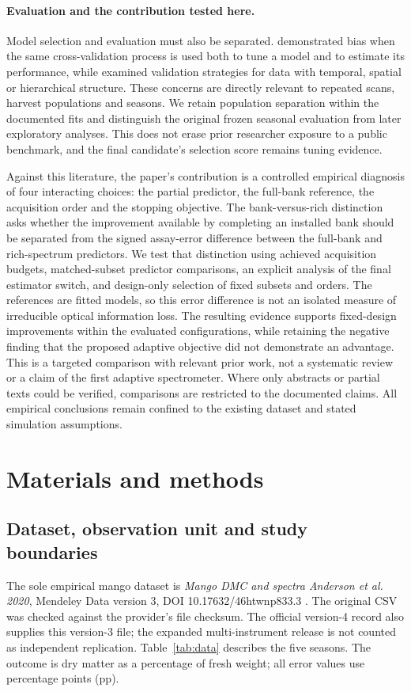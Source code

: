 \documentclass[11pt,a4paper]{article}
\begin{document}
\paragraph{Evaluation and the contribution tested here.}
Model selection and evaluation must also be separated. \citet{varma2006} demonstrated bias when the same cross-validation process is used both to tune a model and to estimate its performance, while \citet{roberts2017} examined validation strategies for data with temporal, spatial or hierarchical structure. These concerns are directly relevant to repeated scans, harvest populations and seasons. We retain population separation within the documented fits and distinguish the original frozen seasonal evaluation from later exploratory analyses. This does not erase prior researcher exposure to a public benchmark, and the final candidate's selection score remains tuning evidence.

Against this literature, the paper's contribution is a controlled empirical diagnosis of four interacting choices: the partial predictor, the full-bank reference, the acquisition order and the stopping objective. The bank-versus-rich distinction asks whether the improvement available by completing an installed bank should be separated from the signed assay-error difference between the full-bank and rich-spectrum predictors. We test that distinction using achieved acquisition budgets, matched-subset predictor comparisons, an explicit analysis of the final estimator switch, and design-only selection of fixed subsets and orders. The references are fitted models, so this error difference is not an isolated measure of irreducible optical information loss. The resulting evidence supports fixed-design improvements within the evaluated configurations, while retaining the negative finding that the proposed adaptive objective did not demonstrate an advantage. This is a targeted comparison with relevant prior work, not a systematic review or a claim of the first adaptive spectrometer. Where only abstracts or partial texts could be verified, comparisons are restricted to the documented claims. All empirical conclusions remain confined to the existing dataset and stated simulation assumptions.


\section{Materials and methods}
\subsection{Dataset, observation unit and study boundaries}
The sole empirical mango dataset is \emph{Mango DMC and spectra Anderson et al. 2020}, Mendeley Data version 3, DOI 10.17632/46htwnp833.3 \citep{andersondata2024}. The original CSV was checked against the provider's file checksum. The official version-4 record also supplies this version-3 file; the expanded multi-instrument release is not counted as independent replication. Table~\ref{tab:data} describes the five seasons. The outcome is dry matter as a percentage of fresh weight; all error values use percentage points (pp).
\end{document}
